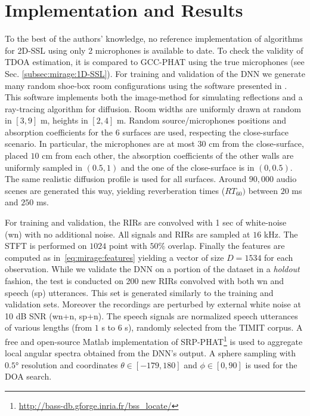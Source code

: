 \section{Implementation and Results}\label{sec:mirage:exp}
To the best of the authors' knowledge, no reference implementation of algorithms
for 2D-SSL using only 2 microphones is available to date.
To check the validity of TDOA estimation, it is compared to GCC-PHAT using
the true microphones (see Sec. \cref{subsec:mirage:1D-SSL}).
For training and validation of the DNN we generate many random
shoe-box room configurations using the software presented in .
This software implements both the image-method for simulating reflections and
a ray-tracing algorithm for diffusion.
Room widths are uniformly drawn at random in $[3, 9]$ m, heights in $[2, 4]$ m.
Random source/microphones positions and absorption coefficients for the 6 surfaces are used,
respecting the close-surface scenario. In particular, the microphones are at most $30$ cm from the close-surface,
placed $10$ cm from each other, the absorption coefficients of the other walls are
uniformly sampled in $(0.5, 1)$ and the one of the close-surface is in $(0, 0.5)$.
The same realistic diffusion profile  is used for all surfaces.
Around $90,000$ audio scenes are generated this way, yielding reverberation times ($RT_{60})$ between $20$ ms and $250$ ms.

For training and validation, the RIRs are convolved with 1 sec of white-noise (wn) with no additional noise.
All signals and RIRs are sampled at $16$ kHz. The STFT is performed on $1024$ point with $50\%$ overlap.
Finally the features are computed as in~\eqref{eq:mirage:features} yielding a vector of size $D = 1534$ for each observation.
While we validate the DNN on a portion of the dataset in a \textit{holdout} fashion, the test is conducted on 200 new RIRs convolved with both wn and speech (sp) utterances.
This set is generated similarly to the training and validation sets. Moreover the recordings are perturbed by external white noise at 10 dB SNR (wn+n, sp+n).
The speech signals are normalized speech utterances of various lengths (from $1$ s to $6$ s), randomly selected from the TIMIT corpus.
A free and open-source Matlab implementation of SRP-PHAT\footnote{\url{http://bass-db.gforge.inria.fr/bss_locate/}} is used to aggregate local angular spectra obtained from the DNN's output.
A sphere sampling with $\ang{0.5}$ resolution and coordinates $\theta \in [-179, 180]$ and $\phi \in [0, 90]$ is used for the DOA search.

